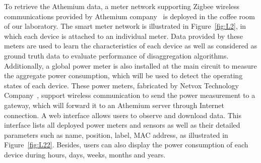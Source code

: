 To retrieve the Athemium data, a meter network supporting Zigbee wireless communications provided by Athemium company~\cite{Athemium} is deployed in the coffee room of our laboratory. 
The smart meter network is illustrated in Figure~\ref{fig:L2}, in which each device is attached to an individual meter. Data provided by these meters are used to learn the characteristics of each device as well as considered as ground truth data to evaluate performance of disaggregation algorithms. Additionally, a global power meter is also installed at the main circuit to measure the aggregate power consumption, which will be used to detect the operating states of each device. These power meters, fabricated by Netvox Technology Company~\cite{Netvok}, support wireless communication to send the power measurement to a gateway, which will forward it to an Athemium server through Internet connection. A web interface allows users to observe and download data. This interface lists all deployed power meters and sensors as well as their detailed parameters such as name, position, label, MAC address, as illustrated in Figure~\ref{fig:L22}. Besides, users can also display the power consumption of each device during hours, days, weeks, months and years.
